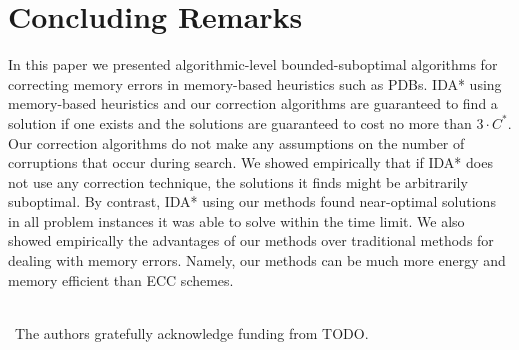 \documentclass[letterpaper]{article}
\begin{document}

\section{Concluding Remarks}

In this paper we presented algorithmic-level bounded-suboptimal algorithms for correcting memory errors in memory-based heuristics such as PDBs. %
IDA* using memory-based heuristics and our correction algorithms are guaranteed to find a solution if one exists and the solutions are guaranteed to cost no more than $3 \cdot C^*$. Our correction algorithms do not make any assumptions on the number of corruptions that occur during search. We showed empirically that if IDA* does not use any correction technique, the solutions it finds might be arbitrarily suboptimal. %
By contrast, IDA* using our methods found near-optimal solutions in all problem instances it was able to solve within the time limit. We also showed empirically the advantages of our methods over traditional methods for dealing with memory errors. Namely, our methods can be much more energy and memory efficient than ECC schemes.

~~\\
~The authors gratefully acknowledge funding from TODO.



\clearpage

\end{document}

